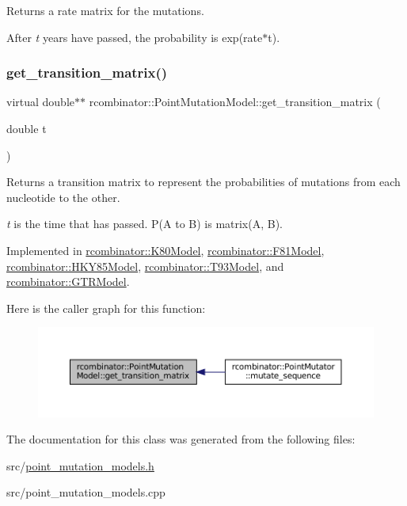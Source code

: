 Returns a rate matrix for the mutations. 

After {\itshape t} years have passed, the probability is exp(rate$\ast$t). \mbox{\label{classrcombinator_1_1PointMutationModel_a35a8b397c8fa932cd870174aa45180da}} 
\subsubsection{\texorpdfstring{get\+\_\+transition\+\_\+matrix()}{get\_transition\_matrix()}}
{\footnotesize\ttfamily virtual double$\ast$$\ast$ rcombinator\+::\+Point\+Mutation\+Model\+::get\+\_\+transition\+\_\+matrix (\begin{DoxyParamCaption}\item[{double}]{t }\end{DoxyParamCaption})\hspace{0.3cm}{\ttfamily [pure virtual]}}



Returns a transition matrix to represent the probabilities of mutations from each nucleotide to the other. 

{\itshape t} is the time that has passed. P(\+A to B) is matrix(\+A, B). 

Implemented in \mbox{\hyperlink{classrcombinator_1_1K80Model_a35aec33b0b090ab23dc7e0985d1bedf5}{rcombinator\+::\+K80\+Model}}, \mbox{\hyperlink{classrcombinator_1_1F81Model_a7b8cc2e77bd7d15582aaa77aa876755c}{rcombinator\+::\+F81\+Model}}, \mbox{\hyperlink{classrcombinator_1_1HKY85Model_a156ac5c3789bc479857299469269c4de}{rcombinator\+::\+H\+K\+Y85\+Model}}, \mbox{\hyperlink{classrcombinator_1_1T93Model_ac8e280547d6af408e24df5e114d2c5c9}{rcombinator\+::\+T93\+Model}}, and \mbox{\hyperlink{classrcombinator_1_1GTRModel_aca26ae97d8ee3af6cc3c372d4d606e64}{rcombinator\+::\+G\+T\+R\+Model}}.

Here is the caller graph for this function\+:\nopagebreak
\begin{figure}[H]
\begin{center}
\leavevmode
\includegraphics[width=350pt]{classrcombinator_1_1PointMutationModel_a35a8b397c8fa932cd870174aa45180da_icgraph}
\end{center}
\end{figure}


The documentation for this class was generated from the following files\+:\begin{DoxyCompactItemize}
\item 
src/\mbox{\hyperlink{point__mutation__models_8h}{point\+\_\+mutation\+\_\+models.\+h}}\item 
src/point\+\_\+mutation\+\_\+models.\+cpp\end{DoxyCompactItemize}
